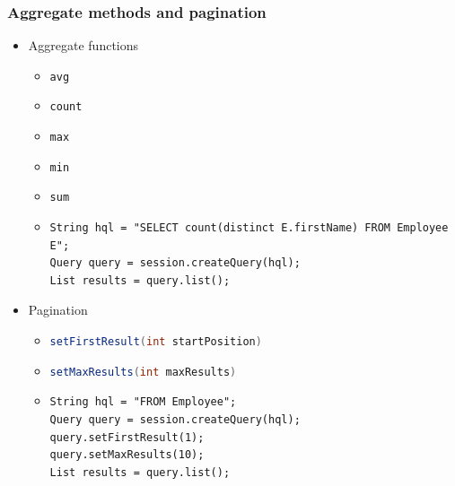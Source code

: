 \documentclass[10pt,xcolor=pdflatex]{beamer}
\newcommand{\inlinejava}{\lstinline[language={Java}]}
\begin{document}
\begin{frame}[fragile]\frametitle{Aggregate methods and pagination}
	\begin{itemize}
		\item Aggregate functions
          \begin{itemize}
        	\item \texttt{avg}
            \item \texttt{count}
            \item \texttt{max}
            \item \texttt{min}
            \item \texttt{sum}
            \item[]
                \begin{footnotesize}
                \lstset{language=Java}
                \begin{lstlisting}    
String hql = "SELECT count(distinct E.firstName) FROM Employee E";
Query query = session.createQuery(hql);
List results = query.list();                
                \end{lstlisting}  
                \end{footnotesize}
          \end{itemize}
		\item Pagination
          \begin{itemize}
        	\item \inlinejava{setFirstResult(int startPosition)}
        	\item \inlinejava{setMaxResults(int maxResults)}
            \item[]
                \begin{footnotesize}
                \lstset{language=Java}
                \begin{lstlisting}     
String hql = "FROM Employee";
Query query = session.createQuery(hql);
query.setFirstResult(1);
query.setMaxResults(10);
List results = query.list();                
                \end{lstlisting}  
                \end{footnotesize}
          \end{itemize}
	\end{itemize}
\end{frame}
\end{document}
